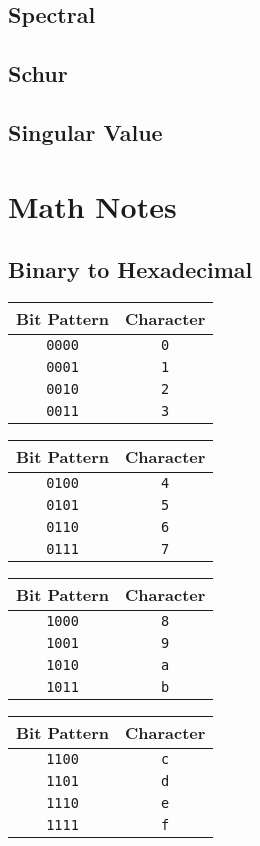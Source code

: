 \documentclass[10pt,letterpaper]{scrartcl}
\begin{document}
\subsection{Spectral}
\subsection{Schur}
\subsection{Singular Value}


\newpage\section{Math Notes}
\subsection{Binary to Hexadecimal}
\begin{table}[!ht]
	\parbox{.5\linewidth}{
		\begin{tabular}{|c|c|}
			\hline 
			Bit Pattern   & Character  \\ \hline\hline 
			\texttt{0000} & \texttt{0} \\ \hline 
			\texttt{0001} & \texttt{1} \\ \hline 
			\texttt{0010} & \texttt{2} \\ \hline 
			\texttt{0011} & \texttt{3} \\ \hline 
		\end{tabular}
	}
	\hfill\parbox{.5\linewidth}{
		\begin{tabular}{| c | c |}
			\hline 
			Bit Pattern   & Character  \\ \hline\hline 
			\texttt{0100} & \texttt{4} \\ \hline 
			\texttt{0101} & \texttt{5} \\ \hline 
			\texttt{0110} & \texttt{6} \\ \hline 
			\texttt{0111} & \texttt{7} \\ \hline 
		\end{tabular}
	}
	\hfill\parbox{.5\linewidth}{
		\begin{tabular}{| c | c |}
			\hline
			Bit Pattern   & Character  \\ \hline\hline 
			\texttt{1000} & \texttt{8} \\ \hline 
			\texttt{1001} & \texttt{9} \\ \hline 
			\texttt{1010} & \texttt{a} \\ \hline 
			\texttt{1011} & \texttt{b} \\ \hline 
		\end{tabular}
	}
	\hfill\parbox{.5\linewidth}{
		\begin{tabular}{| c | c |}
			\hline
			Bit Pattern   & Character  \\ \hline\hline 
			\texttt{1100} & \texttt{c} \\ \hline 
			\texttt{1101} & \texttt{d} \\ \hline 
			\texttt{1110} & \texttt{e} \\ \hline 
			\texttt{1111} & \texttt{f} \\ \hline 
		\end{tabular}
	}
\end{table}
\end{document}
